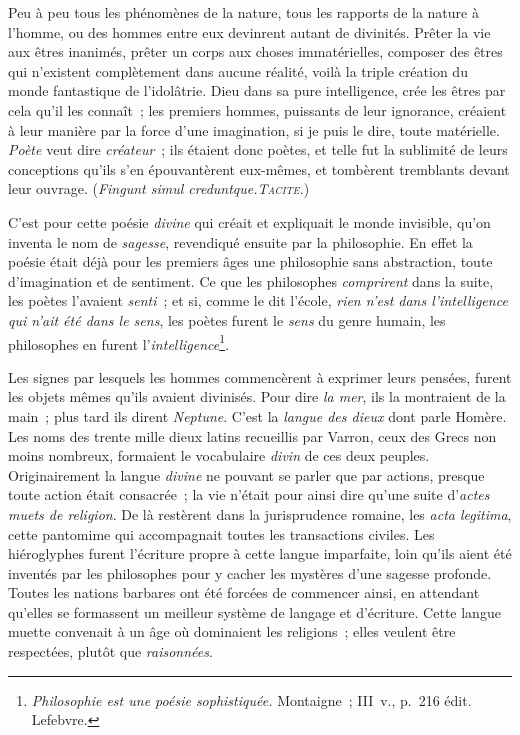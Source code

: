 \documentclass[french,twoside]{book} %
\begin{document}
Peu à peu tous les phénomènes de la nature, tous les rapports de la nature à l’homme, ou des hommes entre eux devinrent autant de divinités. Prêter la vie aux êtres inanimés, prêter un corps aux choses immatérielles, composer des êtres qui n’existent complètement dans aucune réalité, voilà  la triple création du monde fantastique de l’idolâtrie. Dieu dans sa pure intelligence, crée les êtres par cela qu’il les connaît ; les premiers hommes, puissants de leur ignorance, créaient à leur manière par la force d’une imagination, si je puis le dire, toute matérielle. {\itshape Poète} veut dire {\itshape créateur} ; ils étaient donc poètes, et telle fut la sublimité de leurs conceptions qu’ils s’en épouvantèrent eux-mêmes, et tombèrent tremblants devant leur ouvrage. (\emph{{\itshape Fingunt simul creduntque.}{\scshape Tacite}.})\par
C’est pour cette poésie {\itshape divine} qui créait et expliquait le monde invisible, qu’on inventa le nom de {\itshape sagesse}, revendiqué ensuite par la philosophie. En effet la poésie était déjà pour les premiers âges une philosophie sans abstraction, toute d’imagination et de sentiment. Ce que les philosophes {\itshape comprirent} dans la suite, les poètes l’avaient {\itshape senti} ; et si, comme le dit l’école, {\itshape rien n’est dans l’intelligence qui n’ait été dans le sens}, les poètes furent le {\itshape sens} du genre humain, les philosophes en furent l’{\itshape intelligence}\footnote{\emph{{\itshape Philosophie est une poésie sophistiquée.}} Montaigne ; III v., p. 216 édit. Lefebvre.}.\par
Les signes par lesquels les hommes commencèrent à exprimer leurs pensées, furent les objets mêmes qu’ils avaient divinisés. Pour dire {\itshape la mer}, ils la montraient de la main ; plus tard ils dirent  {\itshape Neptune}. C’est la {\itshape langue des dieux} dont parle Homère. Les noms des trente mille dieux latins recueillis par Varron, ceux des Grecs non moins nombreux, formaient le vocabulaire {\itshape divin} de ces deux peuples. Originairement la langue {\itshape divine} ne pouvant se parler que par actions, presque toute action était consacrée ; la vie n’était pour ainsi dire qu’une suite d’{\itshape actes muets de religion}. De là restèrent dans la jurisprudence romaine, les {\itshape acta legitima}, cette pantomime qui accompagnait toutes les transactions civiles. Les hiéroglyphes furent l’écriture propre à cette langue imparfaite, loin qu’ils aient été inventés par les philosophes pour y cacher les mystères d’une sagesse profonde. Toutes les nations barbares ont été forcées de commencer ainsi, en attendant qu’elles se formassent un meilleur système de langage et d’écriture. Cette langue muette convenait à un âge où dominaient les religions ; elles veulent être respectées, plutôt que {\itshape raisonnées}.\par
\end{document}
